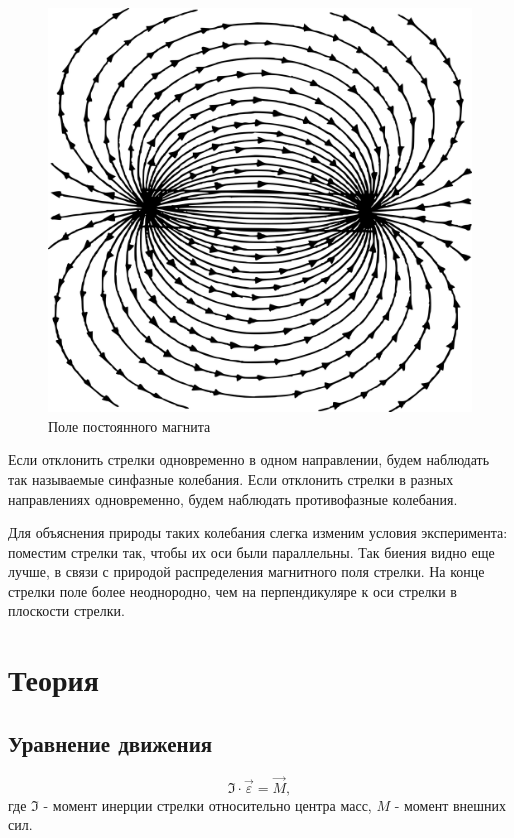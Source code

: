 \documentclass{letask}
\begin{document}
\begin{figure}
\includegraphics[width = 0.3\tw]{field}
\caption{Поле постоянного магнита}
\end{figure}

Если отклонить стрелки одновременно в одном направлении, будем наблюдать так называемые \textsf{синфазные} колебания. 
Если отклонить стрелки в разных направлениях одновременно, будем наблюдать \textsf{противофазные} колебания. 

Для объяснения природы таких колебания слегка изменим условия эксперимента: поместим стрелки так, чтобы их оси были параллельны. Так биения видно еще лучше, в связи с природой распределения магнитного поля стрелки. На конце стрелки поле более неоднородно, чем на перпендикуляре к оси стрелки в плоскости стрелки.


\section{Теория}

\subsection{Уравнение движения}  

\begin{equation}
\mathfrak{I} \cdot \vec{\varepsilon} = \vec{M},
\end{equation}
где $\mathfrak{I}$ - момент инерции стрелки относительно центра масс, $M$ - момент внешних сил.
\end{document}
